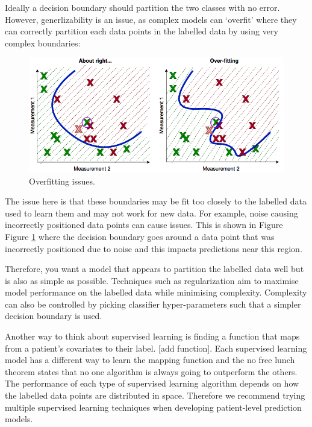 \documentclass[11pt]{book}
\begin{document}
Ideally a decision boundary should partition the two classes with no
error. However, generlizability is an issue, as complex models can
`overfit' where they can correctly partition each data points in the
labelled data by using very complex boundaries:

\begin{figure}
\includegraphics[width=1\linewidth]{images/PatientLevelPrediction/theory/noise} \caption{Overfitting issues.}\label{fig:figuretheory5}
\end{figure}

The issue here is that these boundaries may be fit too closely to the
labelled data used to learn them and may not work for new data. For
example, noise causing incorrectly positioned data points can cause
issues. This is shown in Figure Figure \ref{fig:figuretheory5} where the
decision boundary goes around a data point that was incorrectly
positioned due to noise and this impacts predictions near this region.

Therefore, you want a model that appears to partition the labelled data
well but is also as simple as possible. Techniques such as
regularization aim to maximise model performance on the labelled data
while minimising complexity. Complexity can also be controlled by
picking classifier hyper-parameters such that a simpler decision
boundary is used.

Another way to think about supervised learning is finding a function
that maps from a patient's covariates to their label. {[}add
function{]}. Each supervised learning model has a different way to learn
the mapping function and the no free lunch theorem states that no one
algorithm is always going to outperform the others. The performance of
each type of supervised learning algorithm depends on how the labelled
data points are distributed in space. Therefore we recommend trying
multiple supervised learning techniques when developing patient-level
prediction models.
\end{document}
